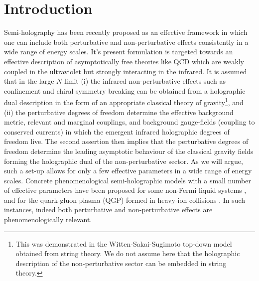 \documentclass[prd,reprint,a4paper,showpacs,superscriptaddress,11pt,onecolumn,nofootinbib]{revtex4-1}
\renewcommand{\(}{\left(}
\renewcommand{\)}{\right)}
\newcommand{\6}{\partial}
\begin{document}
\maketitle

\begin{spacing}{1.8}
\tableofcontents
\end{spacing}
\section{Introduction}

Semi-holography has been recently proposed as an effective framework in which one can include both perturbative and non-perturbative effects consistently in a wide range of energy scales. It's present formulation is targeted towards an effective description of asymptotically free theories like QCD which are weakly coupled in the ultraviolet but strongly interacting in the infrared. It is assumed that in the large $N$ limit (i) the infrared non-perturbative effects such as confinement and chiral symmetry breaking can be obtained from a holographic dual description in the form of an appropriate classical theory of gravity\footnote{This was demonstrated in the Witten-Sakai-Sugimoto top-down model \cite{Witten:1998zw,Sakai:2004cn,Sakai:2005yt} obtained from string theory. We do not assume here that the holographic description of the non-perturbative sector can be embedded in string theory.}, and (ii) the perturbative degrees of freedom determine the effective background metric, relevant and marginal couplings, and background gauge-fields (coupling to conserved currents) in which the emergent infrared holographic degrees of freedom live. The second assertion then implies that the perturbative degrees of freedom determine the leading asymptotic behaviour of the classical gravity fields forming the holographic dual of the non-perturbative sector. As we will argue, such a set-up allows for only a few effective parameters in a wide range of energy scales. Concrete phenomenological semi-holographic models with a small number of effective parameters have been proposed  for some non-Fermi liquid systems \cite{Faulkner:2010tq,Gursoy:2011gz,Gursoy:2012ie,Mukhopadhyay:2013dqa,Jacobs:2014lha,Jacobs:2015fiv}, and for the quark-gluon plasma (QGP) formed in heavy-ion collisions \cite{Iancu:2014ava,Mukhopadhyay:2015smb}. In such instances, indeed both perturbative and non-perturbative effects are phenomenologically relevant.
\end{document}
